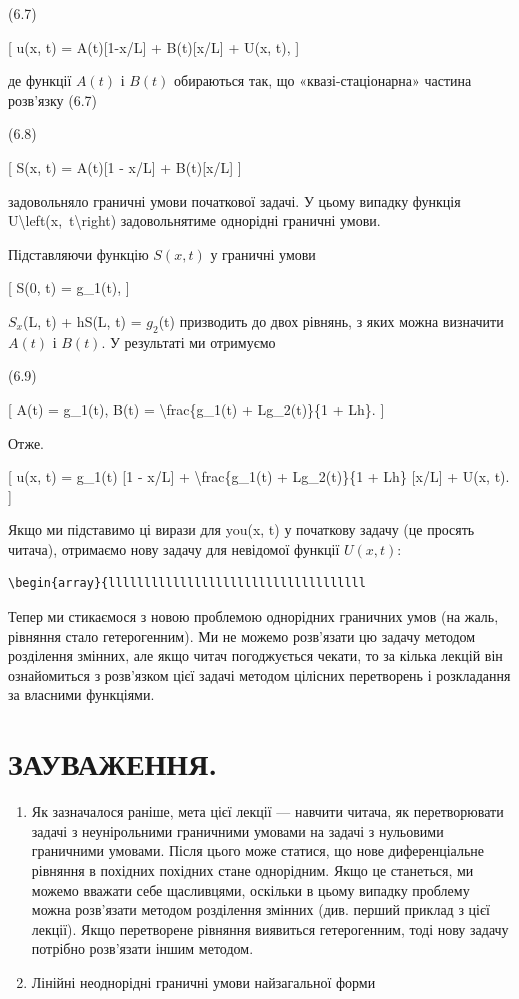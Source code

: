 \documentclass[
]{article}
\begin{document}
(6.7)

{[} u(x, t) = A(t){[}1-x/L{]} + B(t){[}x/L{]} + U(x, t), {]}

де функції \(A\left(t\right)\) і \(B\left(t\right)\) обираються так, що
«квазі-стаціонарна» частина розв'язку (6.7)

(6.8)

{[} S(x, t) = A(t){[}1 - x/L{]} + B(t){[}x/L{]} {]}

задовольняло граничні умови початкової задачі. У цьому випадку функція
U\textbackslash left(x,~t\textbackslash right) задовольнятиме однорідні
граничні умови.

Підставляючи функцію \(S(x, t)\) у граничні умови

{[} S(0, t) = g\_1(t), {]}

\(S_x\)(L, t) + hS(L, t) = \(g_2\)(t) призводить до двох рівнянь, з яких
можна визначити \(A(t)\) і \(B(t)\). У результаті ми отримуємо

(6.9)

{[} A(t) = g\_1(t), B(t) = \textbackslash frac\{g\_1(t) + Lg\_2(t)\}\{1
+ Lh\}. {]}

Отже.

{[} u(x, t) = g\_1(t) {[}1 - x/L{]} + \textbackslash frac\{g\_1(t) +
Lg\_2(t)\}\{1 + Lh\} {[}x/L{]} + U(x, t). {]}

Якщо ми підставимо ці вирази для you(x, t) у початкову задачу (це
просять читача), отримаємо нову задачу для невідомої функції
\(U(x, t)\):

\begin{verbatim}
\begin{array}{llllllllllllllllllllllllllllllllllll
\end{verbatim}

Тепер ми стикаємося з новою проблемою однорідних граничних умов (на
жаль, рівняння стало гетерогенним). Ми не можемо розв'язати цю задачу
методом розділення змінних, але якщо читач погоджується чекати, то за
кілька лекцій він ознайомиться з розв'язком цієї задачі методом цілісних
перетворень і розкладання за власними функціями.

\section{ЗАУВАЖЕННЯ.}\label{ux437ux430ux443ux432ux430ux436ux435ux43dux43dux44f.}

\begin{enumerate}
\def\labelenumi{\arabic{enumi}.}
\item
  Як зазначалося раніше, мета цієї лекції --- навчити читача, як
  перетворювати задачі з неунірольними граничними умовами на задачі з
  нульовими граничними умовами. Після цього може статися, що нове
  диференціальне рівняння в похідних похідних стане однорідним. Якщо це
  станеться, ми можемо вважати себе щасливцями, оскільки в цьому випадку
  проблему можна розв'язати методом розділення змінних (див. перший
  приклад з цієї лекції). Якщо перетворене рівняння виявиться
  гетерогенним, тоді нову задачу потрібно розв'язати іншим методом.
\item
  Лінійні неоднорідні граничні умови найзагальної форми
\end{enumerate}
\end{document}
